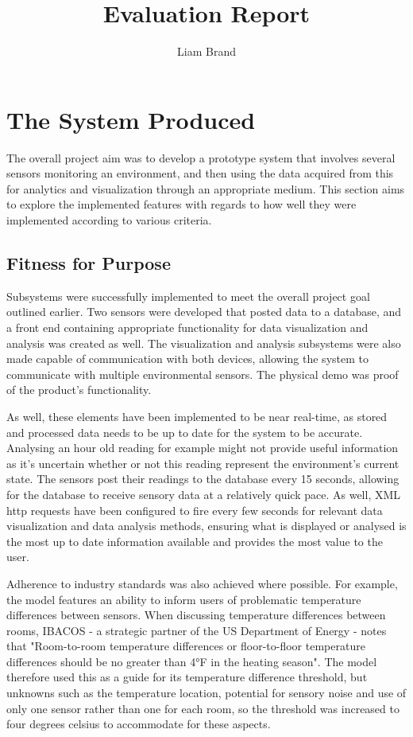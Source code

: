 \documentclass[]{report}
\title{Evaluation Report}
\author{Liam Brand}
\date{}
\begin{document}
\maketitle

\section{The System Produced}
The overall project aim was to develop a prototype system that involves several sensors monitoring an environment, and then using the data acquired from this for analytics and visualization through an appropriate medium. This section aims to explore the implemented features with regards to how well they were implemented according to various criteria.

	\subsection{Fitness for Purpose}
	Subsystems were successfully implemented to meet the overall project goal outlined earlier. Two sensors were developed that posted data to a database, and a front end containing appropriate functionality for data visualization and analysis was created as well. The visualization and analysis subsystems were also made capable of communication with both devices, allowing the system to communicate with multiple environmental sensors. The physical demo was proof of the product's functionality.
	
	As well, these elements have been implemented to be near real-time, as stored and processed data needs to be up to date for the system to be accurate. Analysing an hour old reading for example might not provide useful information as it's uncertain whether or not this reading represent the environment's current state. The sensors post their readings to the database every 15 seconds, allowing for the database to receive sensory data at a relatively quick pace. As well, XML http requests have been configured to fire every few seconds for relevant data visualization and data analysis methods, ensuring what is displayed or analysed is the most up to date information available and provides the most value to the user.
	
	Adherence to industry standards was also achieved where possible. For example, the model features an ability to inform users of problematic temperature differences between sensors. When discussing temperature differences between rooms, IBACOS - a strategic partner of the US Department of Energy - notes that "Room-to-room temperature differences or floor-to-floor temperature differences should be no greater than 4°F in the heating season"\cite{burdick2011advanced}. The model therefore used this as a guide for its temperature difference threshold, but unknowns such as the temperature location, potential for sensory noise and use of only one sensor rather than one for each room, so the threshold was increased to four degrees celsius to accommodate for these aspects.
	
\end{document}
